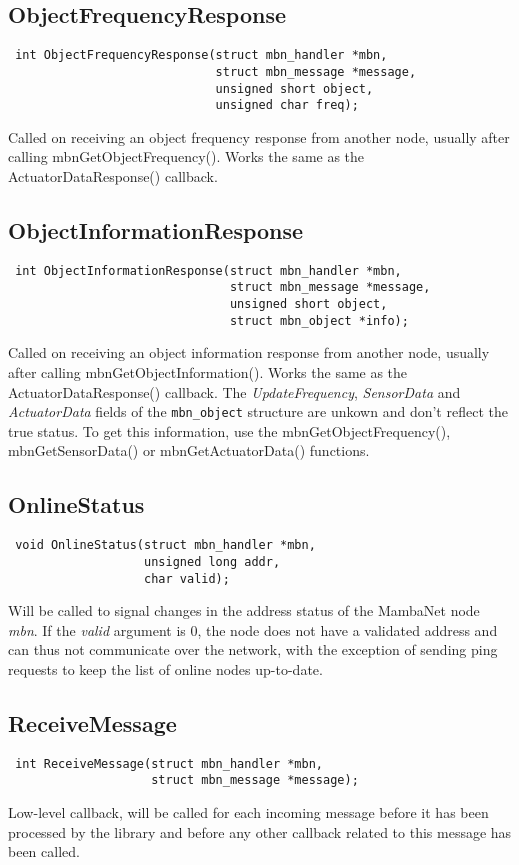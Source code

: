 \subsection{ObjectFrequencyResponse}
\begin{verbatim}
 int ObjectFrequencyResponse(struct mbn_handler *mbn,
                             struct mbn_message *message,
                             unsigned short object,
                             unsigned char freq);
\end{verbatim}
Called on receiving an object frequency response from another node, usually after calling mbnGetObjectFrequency(). Works the same as the ActuatorDataResponse() callback.


\subsection{ObjectInformationResponse}
\begin{verbatim}
 int ObjectInformationResponse(struct mbn_handler *mbn,
                               struct mbn_message *message,
                               unsigned short object,
                               struct mbn_object *info);
\end{verbatim}
Called on receiving an object information response from another node, usually after calling mbnGetObjectInformation(). Works the same as the ActuatorDataResponse() callback. The \textit{UpdateFrequency}, \textit{SensorData} and \textit{ActuatorData} fields of the \verb|mbn_object| structure are unkown and don't reflect the true status. To get this information, use the mbnGetObjectFrequency(), mbnGetSensorData() or mbnGetActuatorData() functions.


\subsection{OnlineStatus}
\begin{verbatim}
 void OnlineStatus(struct mbn_handler *mbn,
                   unsigned long addr,
                   char valid);
\end{verbatim}
Will be called to signal changes in the address status of the MambaNet node \textit{mbn}. If the \textit{valid} argument is 0, the node does not have a validated address and can thus not communicate over the network, with the exception of sending ping requests to keep the list of online nodes up-to-date.


\subsection{ReceiveMessage}
\begin{verbatim}
 int ReceiveMessage(struct mbn_handler *mbn,
                    struct mbn_message *message);
\end{verbatim}
Low-level callback, will be called for each incoming message before it has been processed by the library and before any other callback related to this message has been called.

